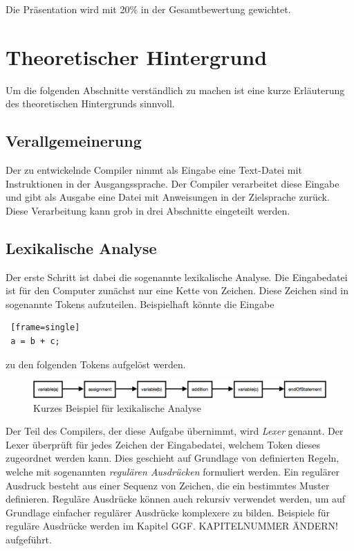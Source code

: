 \documentclass[12pt, a4paper, oneside, ngerman]{article}
\begin{document}
Die Präsentation wird mit 20\% in der Gesamtbewertung gewichtet.

\pagebreak
\section{Theoretischer Hintergrund}
Um die folgenden Abschnitte verständlich zu machen ist eine kurze Erläuterung des theoretischen Hintergrunds sinnvoll.
\subsection{Verallgemeinerung}
Der zu entwickelnde Compiler nimmt als Eingabe eine Text-Datei mit Instruktionen in der Ausgangssprache. Der Compiler verarbeitet diese Eingabe und gibt als Ausgabe eine Datei mit Anweisungen in der Zielsprache zurück. Diese Verarbeitung kann grob in drei Abschnitte eingeteilt werden.
\subsection{Lexikalische Analyse}
Der erste Schritt ist dabei die sogenannte lexikalische Analyse. Die Eingabedatei ist für den Computer zunächst nur eine Kette von Zeichen. Diese Zeichen sind in sogenannte Tokens aufzuteilen. Beispielhaft könnte die Eingabe
\begin{lstlisting} [frame=single]
 a = b + c;
\end{lstlisting}

zu den folgenden Tokens aufgelöst werden.

\begin{figure}[h!]
\centering
\includegraphics[scale=0.37]{lex_beispiel.png}
\caption{Kurzes Beispiel für lexikalische Analyse}
\label{fig:method}
\end{figure}


Der Teil des Compilers, der diese Aufgabe übernimmt, wird \textit{Lexer} genannt. Der Lexer überprüft für jedes Zeichen der Eingabedatei, welchem Token dieses zugeordnet werden kann. Dies geschieht auf Grundlage von definierten Regeln, welche mit sogenannten \textit{regulären Ausdrücken} formuliert werden. Ein regulärer Ausdruck besteht aus einer Sequenz von Zeichen, die ein bestimmtes Muster definieren. Reguläre Ausdrücke können auch rekursiv verwendet werden, um auf Grundlage einfacher regulärer Ausdrücke komplexere zu bilden. Beispiele für reguläre Ausdrücke werden im Kapitel  GGF. KAPITELNUMMER ÄNDERN! aufgeführt.
\end{document}
